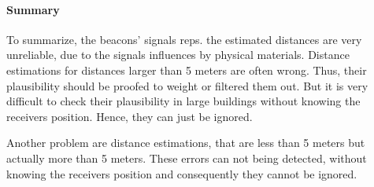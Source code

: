 \paragraph{Summary}
To summarize, the beacons' signals reps. the estimated distances are very unreliable, due to the signals influences by physical materials.
Distance estimations for distances larger than 5 meters are often wrong.
Thus, their plausibility should be proofed to weight or filtered them out.
But it is very difficult to check their plausibility in large buildings without knowing the receivers position.
Hence, they can just be ignored.

Another problem are distance estimations, that are less than 5 meters but actually more than 5 meters. These errors can not being detected, without knowing the receivers position and consequently they cannot be ignored.
